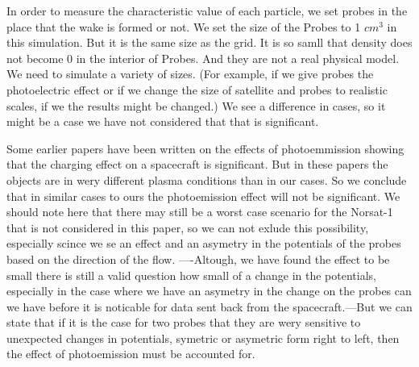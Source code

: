 
In order to measure the characteristic value of each particle, we set probes in the
place that the wake is formed or not. 
We set the size of the Probes to 1 $cm^3$ in this simulation. But it is the same size as the grid.
It is so samll that density does not become 0 in the interior of Probes. And they are not a real 
physical model. We need to simulate a variety of sizes.
(For example, if we give probes the photoelectric effect or if we change the size of satellite and 
probes to realistic scales, if we the results might be changed.)
We see a difference in cases, so it might be a case we have not considered that that is significant.

Some earlier papers have been written on the effects of photoemmission showing that the charging effect 
on a spacecraft is significant.\citep{Ergun} But in these papers the objects are in wery different
plasma conditions than in our cases. So we conclude that in similar cases to ours the photoemission effect
will not be significant. We should note here that there may still be a worst case scenario for the Norsat-1
that is not considered in this paper, so we can not exlude this possibility, especially scince we se an effect and an
asymetry in the potentials of the probes based on the direction of the flow. ----Altough, we have found the effect to be small 
there is still a valid question how small of a change in the potentials, especially in the case where we have an asymetry in
the change on the probes can we have before it is noticable for data sent back from the spacecraft.---But we can state that if 
it is the case for two probes that they are wery sensitive to unexpected changes in potentials, symetric or asymetric form 
right to left, then the effect of photoemission must be accounted for.